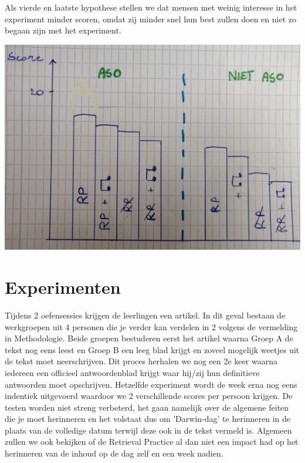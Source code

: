 \documentclass{hogent-article}
\begin{document}
	Als vierde en laatste hypothese stellen we dat mensen met weinig interesse in het experiment minder scoren, omdat zij minder snel hun best zullen doen en niet zo begaan zijn met het experiment.
	
	
	
	\begin{minipage}[b]{2.8in}
		\centering
		\includegraphics[width=\linewidth]{img/imgg2.jpg}
	\end{minipage}
	
	\section{Experimenten}
	Tijdens 2 oefensessies krijgen de leerlingen een artikel. In dit geval bestaan de werkgroepen uit 4 personen die je verder kan verdelen in 2 volgens de vermelding in Methodologie. Beide groepen bestuderen eerst het 
	artikel waarna Groep A de tekst nog eens leest en Groep B een leeg blad krijgt en zoveel mogelijk weetjes uit de tekst moet neerschrijven. Dit proces herhalen we nog een 2e keer waarna iedereen een officieel antwoordenblad krijgt waar hij/zij hun definitieve antwoorden moet opschrijven. Hetzelfde experiment wordt de week erna nog eens indentiek uitgevoerd waardoor we 2 verschillende scores per persoon krijgen.
	De testen worden niet streng verbeterd, het gaan namelijk over de algemene feiten die je moet herinneren en het volstaat dus om 'Darwin-dag' te herinneren in de plaats van de volledige datum terwijl deze ook in de tekst vermeld is. Algemeen zullen we ook bekijken of de Retrieval Practice al dan niet een impact had op het herinneren van de inhoud op de dag zelf en een week nadien.
	
\end{document}
